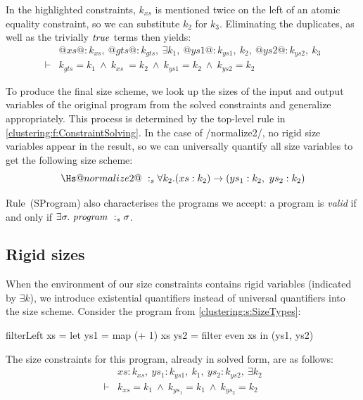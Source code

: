 In the highlighted constraints, $k_{xs}$ is mentioned twice on the left of an atomic equality constraint, so we can substitute $k_2$ for $k_3$. Eliminating the duplicates, as well as the trivially $\mathit{true}$ terms then yields:
$$
\begin{array}{ll}
   & @xs @ : k_{xs},~
@gts@ : k_{gts},~ \exists k_1,~
@ys1@ : k_{ys1},~ k_2,~
@ys2@ : k_{ys2},~ k_3
\\
\vdash & k_{gts} = k_1
        ~\wedge~  k_{xs}  ~= k_2
        ~\wedge~  k_{ys1}  = k_2 
        ~\wedge~  k_{ys2}  = k_2
\end{array}
$$

To produce the final size scheme, we look up the sizes of the input and output variables of the original program from the solved constraints and generalize appropriately.
This process is determined by the top-level rule in \cref{clustering:f:ConstraintSolving}.
In the case of \Hs/normalize2/, no rigid size variables appear in the result, so we can universally quantify all size variables to get the following size scheme:
$$\Hs@normalize2@ ~:_s \forall k_2. (xs : k_2) \to (ys_1 : k_2,~ ys_2 : k_2)
$$


Rule~(SProgram) also characterises the programs we accept: a program is \emph{valid} if and only if $\exists \sigma.\ \mathit{program} ~:_{s} \sigma$. 

\subsection{Rigid sizes}
\label{clustering:s:RigidSizes}
When the environment of our size constraints contains rigid variables (indicated by $\exists k$), we introduce existential quantifiers instead of universal quantifiers into the size scheme.
Consider the \Hs@filterLeft@ program from \cref{clustering:s:SizeTypes}:
\begin{haskell}
filterLeft xs
 = let ys1 = map (+ 1)   xs
       ys2 = filter even xs
   in (ys1, ys2)
\end{haskell}

The size constraints for this program, already in solved form, are as follows:
$$
\begin{array}{ll}
       & xs : k_{xs},~ ys_1 : k_{ys1},~ k_1,~ ys_2 : k_{ys2},~ \exists k_2
\\
\vdash &          k_{xs}   = k_1
        ~\wedge~  k_{ys_1} = k_1 
        ~\wedge~  k_{ys_2} = k_2
\end{array}
$$

